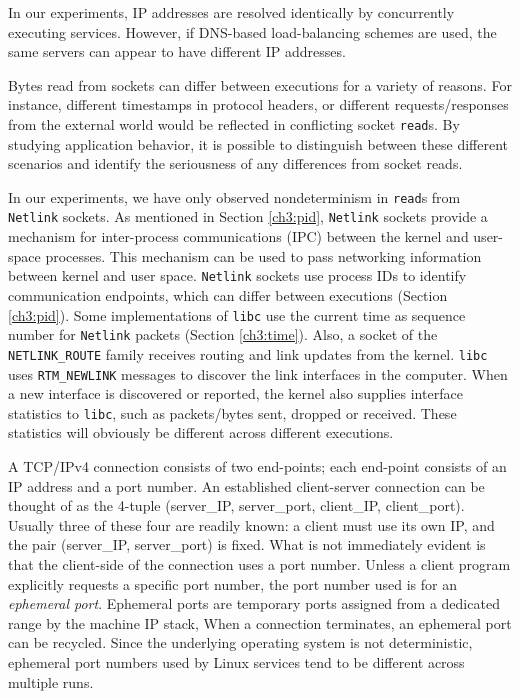  \newline
In our experiments, IP addresses are resolved identically by concurrently executing services. 
However, if DNS-based load-balancing schemes are used, the same 
servers can appear to have different IP addresses. \newline

 \newline
Bytes read from sockets can differ between
executions for a variety
of reasons. For instance, different timestamps in 
protocol headers, or different requests/responses 
from the external world would be reflected in
conflicting socket \texttt{read}s.
By studying application behavior, it is possible
to distinguish between 
these different scenarios and
identify the seriousness
of any differences from socket reads.

In our experiments, we have only observed nondeterminism
in \texttt{read}s from \texttt{Netlink} sockets.
As mentioned in Section \ref{ch3:pid},
\texttt{Netlink} sockets provide a 
mechanism for inter-process communications (IPC)
between the kernel and user-space processes.
This mechanism can be used to pass
networking information between kernel
and user space. \texttt{Netlink} sockets
use process IDs to identify
communication endpoints, which can
differ between executions (Section \ref{ch3:pid}).
Some implementations of \texttt{libc} use
the current time as sequence
number for \texttt{Netlink} packets (Section \ref{ch3:time}).
Also, a
socket of the \texttt{NETLINK\_ROUTE}
family receives routing and link updates
from the kernel. \texttt{libc} uses \texttt{RTM\_NEWLINK}
messages to discover the link interfaces 
in the computer. When a new interface
is discovered or reported, the kernel also supplies
interface statistics to \texttt{libc},
such as packets/bytes sent, dropped or
received. These statistics will obviously be different
across different executions.  \newline

 \newline
A TCP/IPv4 connection consists of two end-points;
each end-point consists of an IP address and a port
number. An established client-server connection 
can be thought of as the
4-tuple (server\_IP, server\_port, client\_IP, client\_port).
Usually three of these four are readily known:
a client must use its own IP, and
the pair (server\_IP, server\_port) is fixed. What is not
immediately evident is that the client-side of 
the connection uses a port number.
Unless a client program explicitly
requests a specific port number,
the port number used is for an {\em ephemeral port}.
Ephemeral ports are temporary ports
assigned from a dedicated range by the machine IP stack,
When a connection
terminates, an ephemeral port can be recycled.
Since the underlying operating system
is not deterministic, ephemeral
port numbers used by Linux services
tend to be different across multiple 
runs. 

